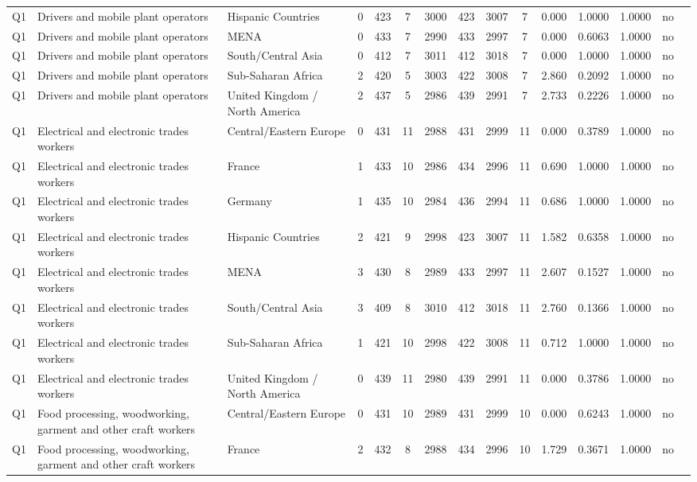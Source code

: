 \begin{longtable}{lllrcccccccccll}
Q1 & Drivers and mobile plant operators & Hispanic Countries & 0 & 423 & 7 & 3000 & 423 & 3007 & 7 & 0.000 & 1.0000 & 1.0000 & no \\
Q1 & Drivers and mobile plant operators & MENA & 0 & 433 & 7 & 2990 & 433 & 2997 & 7 & 0.000 & 0.6063 & 1.0000 & no \\
Q1 & Drivers and mobile plant operators & South/Central Asia & 0 & 412 & 7 & 3011 & 412 & 3018 & 7 & 0.000 & 1.0000 & 1.0000 & no \\
Q1 & Drivers and mobile plant operators & Sub-Saharan Africa & 2 & 420 & 5 & 3003 & 422 & 3008 & 7 & 2.860 & 0.2092 & 1.0000 & no \\
Q1 & Drivers and mobile plant operators & United Kingdom / North America & 2 & 437 & 5 & 2986 & 439 & 2991 & 7 & 2.733 & 0.2226 & 1.0000 & no \\
Q1 & Electrical and electronic trades workers & Central/Eastern Europe & 0 & 431 & 11 & 2988 & 431 & 2999 & 11 & 0.000 & 0.3789 & 1.0000 & no \\
Q1 & Electrical and electronic trades workers & France & 1 & 433 & 10 & 2986 & 434 & 2996 & 11 & 0.690 & 1.0000 & 1.0000 & no \\
Q1 & Electrical and electronic trades workers & Germany & 1 & 435 & 10 & 2984 & 436 & 2994 & 11 & 0.686 & 1.0000 & 1.0000 & no \\
Q1 & Electrical and electronic trades workers & Hispanic Countries & 2 & 421 & 9 & 2998 & 423 & 3007 & 11 & 1.582 & 0.6358 & 1.0000 & no \\
Q1 & Electrical and electronic trades workers & MENA & 3 & 430 & 8 & 2989 & 433 & 2997 & 11 & 2.607 & 0.1527 & 1.0000 & no \\
Q1 & Electrical and electronic trades workers & South/Central Asia & 3 & 409 & 8 & 3010 & 412 & 3018 & 11 & 2.760 & 0.1366 & 1.0000 & no \\
Q1 & Electrical and electronic trades workers & Sub-Saharan Africa & 1 & 421 & 10 & 2998 & 422 & 3008 & 11 & 0.712 & 1.0000 & 1.0000 & no \\
Q1 & Electrical and electronic trades workers & United Kingdom / North America & 0 & 439 & 11 & 2980 & 439 & 2991 & 11 & 0.000 & 0.3786 & 1.0000 & no \\
Q1 & Food processing, woodworking, garment and other craft workers & Central/Eastern Europe & 0 & 431 & 10 & 2989 & 431 & 2999 & 10 & 0.000 & 0.6243 & 1.0000 & no \\
Q1 & Food processing, woodworking, garment and other craft workers & France & 2 & 432 & 8 & 2988 & 434 & 2996 & 10 & 1.729 & 0.3671 & 1.0000 & no \\

\end{longtable}
